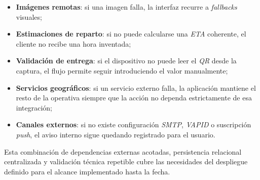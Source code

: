 \begin{itemize}
    \item \textbf{Imágenes remotas}: si una imagen falla, la interfaz recurre a \textit{fallbacks} visuales;
    \item \textbf{Estimaciones de reparto}: si no puede calcularse una \textit{ETA} coherente, el cliente no recibe una hora inventada;
    \item \textbf{Validación de entrega}: si el dispositivo no puede leer el \textit{QR} desde la captura, el flujo permite seguir introduciendo el valor manualmente;
    \item \textbf{Servicios geográficos}: si un servicio externo falla, la aplicación mantiene el resto de la operativa siempre que la acción no dependa estrictamente de esa integración;
    \item \textbf{Canales externos}: si no existe configuración \textit{SMTP}, \textit{VAPID} o suscripción \textit{push}, el aviso interno sigue quedando registrado para el usuario.
\end{itemize}

Esta combinación de dependencias externas acotadas, persistencia relacional centralizada y validación técnica repetible cubre las necesidades del despliegue definido para el alcance implementado hasta la fecha.
